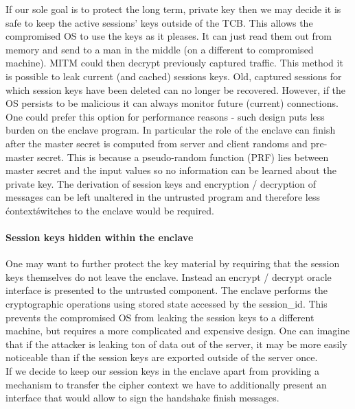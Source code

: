 \documentclass[../../main.tex]{subfiles}
\begin{document}
If our sole goal is to protect the long term, private key then we may
decide it is safe to keep the active sessions' keys outside of the
TCB. This allows the compromised OS to use the keys as it pleases. It
can just read them out from memory and send to a man in the middle (on
a different to compromised machine). MITM could then decrypt
previously captured traffic. This method it is possible to leak
current (and cached) sessions keys. Old, captured sessions for which
session keys have been deleted can no longer be recovered. However, if
the OS persists to be malicious it can always monitor future (current)
connections.\\

\noindent One could prefer this option for performance reasons - such
design puts less burden on the enclave program. In particular the role
of the enclave can finish after the master secret is computed from
server and client randoms and pre-master secret. This is because a
pseudo-random function (PRF) lies between master secret and the input
values so no information can be learned about the private key. The
derivation of session keys and encryption / decryption of messages can
be left unaltered in the untrusted program and therefore less
\'context\' switches to the enclave would be required.

\paragraph{Session keys hidden within the enclave}

One may want to further protect the key material by requiring that the
session keys themselves do not leave the enclave. Instead an encrypt /
decrypt oracle interface is presented to the untrusted component. The
enclave performs the cryptographic operations using stored state
accessed by the session\_id. This prevents the compromised OS from
leaking the session keys to a different machine, but requires a more
complicated and expensive design. One can imagine that if the attacker
is leaking ton of data out of the server, it may be more easily
noticeable than if the session keys are exported outside of the server
once.\\

\noindent If we decide to keep our session keys in the enclave apart
from providing a mechanism to transfer the cipher context we have to
additionally present an interface that would allow to sign the
handshake finish messages.\\
\end{document}
